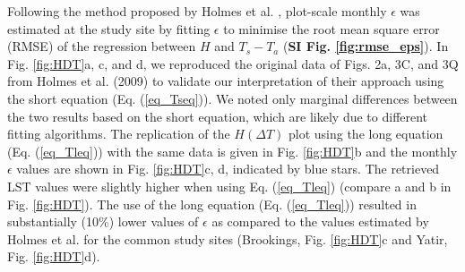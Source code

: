 \documentclass[fleqn,10pt]{wlscirep}
\begin{document}
Following the method proposed by Holmes et al. \cite{holmes2009land, holmes2016cloud}, plot-scale monthly $\epsilon$ was estimated at the study site by fitting $\epsilon$ to minimise the root mean square error (RMSE) of the regression between $H$ and $T_s - T_a$ (\textbf{SI Fig. \ref{fig:rmse_eps}}). In Fig. \ref{fig:HDT}a, c, and d, we reproduced the original data of Figs. 2a, 3C, and 3Q from Holmes et al. (2009) \cite{holmes2009land} to validate our interpretation of their approach using the short equation (Eq. (\ref{eq_Tseq})). We noted only marginal differences between the two results based on the short equation, which are likely due to different fitting algorithms. The replication of the $H (\Delta T)$ plot using the long equation (Eq. (\ref{eq_Tleq})) with the same data is given in Fig. \ref{fig:HDT}b and the monthly $\epsilon$ values are shown in Fig. \ref{fig:HDT}c, d, indicated by blue stars. The retrieved LST values were slightly higher when using Eq. (\ref{eq_Tleq}) (compare a and b in Fig. \ref{fig:HDT}). The use of the long equation (Eq. (\ref{eq_Tleq})) resulted in substantially (10\%) lower values of $\epsilon$ as compared to the values estimated by Holmes et al.\cite{holmes2009land} for the common study sites (Brookings, Fig. \ref{fig:HDT}c and Yatir, Fig. \ref{fig:HDT}d). 
\end{document}
